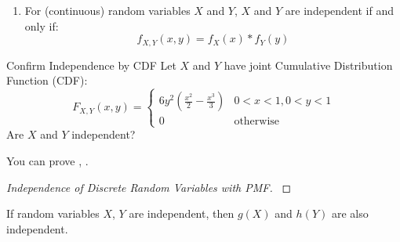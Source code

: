 	\begin{enumerate}[resume]
		\item For (continuous) random variables $X$ and $Y$, $X$ and $Y$ are independent if and only if:
			\begin{equation} \label{eq:Independence of Multiple Continuous Random Variables Using PDF}
				f_{X,Y} \left( x,y \right) = f_{X} \left( x \right) * f_{Y} \left( y \right)
			\end{equation}
	\end{enumerate}
		\begin{example}{Confirm Independence by CDF}
			Let $X$ and $Y$ have joint Cumulative Distribution Function (CDF):
			\begin{equation*}
				F_{X,Y} \left( x,y \right) = \begin{cases}
					6y^{2} \left( \frac{x^{2}}{2} - \frac{x^{3}}{3} \right) & 0 < x < 1, 0 < y < 1 \\
					0 & \text{otherwise}
				\end{cases}
			\end{equation*}
			Are $X$ and $Y$ independent?
		\end{example}
	You can prove , .
	\begin{proof}[Independence of Discrete Random Variables with PMF] \label{proof:Independence of Discrete Random Variables with PMF}

	\end{proof}
	\begin{theorem} \label{thm:Independence of Random Functions}
		If random variables $X$, $Y$ are independent, then $g\left( X \right)$ and $h \left( Y \right)$ are also independent.
	\end{theorem}

